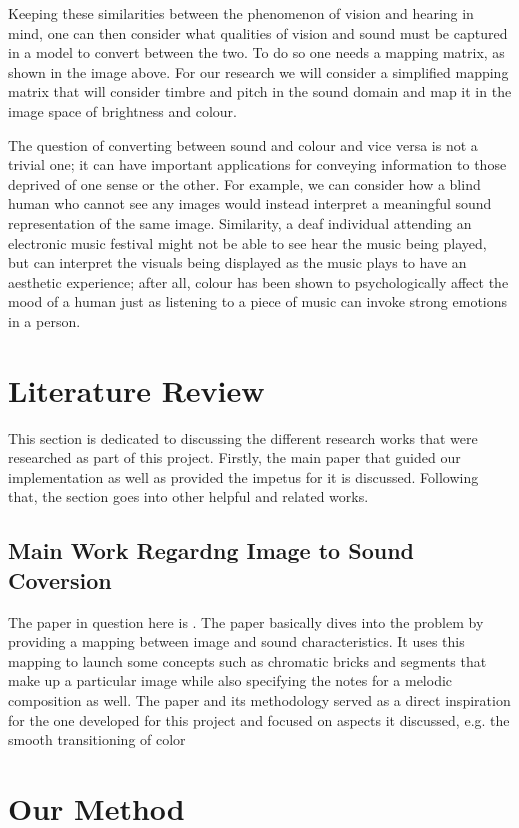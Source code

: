 \documentclass{article}
\begin{document}
Keeping these similarities between the phenomenon of vision and hearing in mind, one can then consider what qualities of vision and sound must be captured in a model to convert between the two. To do so one needs a mapping matrix, as shown in the image above. For our research we will consider a simplified mapping matrix that will consider timbre and pitch in the sound domain and map it in the image space of brightness and colour.

The question of converting between sound and colour and vice versa is not a trivial one; it can have important applications for conveying information to those deprived of one sense or the other. For example, we can consider how a blind human who cannot see any images would instead interpret a meaningful sound representation of the same image. Similarity, a deaf individual attending an electronic music festival might not be able to see hear the music being played, but can interpret the visuals being displayed as the music plays to have an aesthetic experience; after all, colour has been shown to psychologically affect the mood of a human just as listening to a piece of music can invoke strong emotions in a person.

\section{Literature Review}
This section is dedicated to discussing the different research works that were researched as part of this project. Firstly, the main paper that guided our implementation as well as provided the impetus for it is discussed. Following that, the section goes into other helpful and related works.

\subsection{Main Work Regardng Image to Sound Coversion}
The paper in question here is \cite{margounakis2006converting}. The paper basically dives into the problem by providing a mapping between image and sound characteristics. It uses this mapping to launch some concepts such as chromatic bricks and segments that make up a particular image while also specifying the notes for a melodic composition as well. The paper and its methodology served as a direct inspiration for the one developed for this project and focused on aspects it discussed, e.g. the smooth transitioning of color


\section{Our Method}
\end{document}
